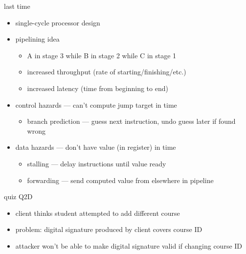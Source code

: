 \date{}
\title{}
\date{}
\usepackage{pgfplots}
\pgfplotsset{compat=1.16}

\begin{frame}
    \titlepage
\end{frame}


\usetikzlibrary{circuits.logic.mux}




\begin{frame}{last time}
    \begin{itemize}
    \item single-cycle processor design
    \item pipelining idea
        \begin{itemize}
        \item A in stage 3 while B in stage 2 while C in stage 1
        \item increased throughput (rate of starting/finishing/etc.)
        \item increased latency (time from beginning to end)
        \end{itemize}
    \item control hazards --- can't compute jump target in time
        \begin{itemize}
        \item branch prediction --- guess next instruction, undo guess later if found wrong
        \end{itemize}
    \item data hazards --- don't have value (in register) in time
        \begin{itemize}
        \item stalling --- delay instructions until value ready
        \item forwarding --- send computed value from elsewhere in pipeline
        \end{itemize}
    \end{itemize}
\end{frame}

\begin{frame}{quiz Q2D}
    \begin{itemize}
    \item client thinks student attempted to add different course
    \item problem: digital signature produced by client covers course ID
    \item attacker won't be able to make digital signature valid if changing course ID
    \end{itemize}
\end{frame}




